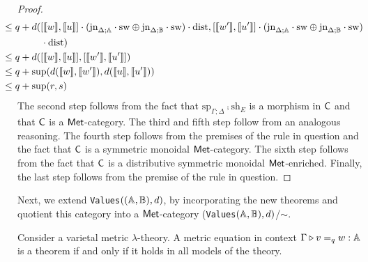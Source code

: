 \begin{proof}
\begin{align*}
    & \hspace{-20pt} \leq  q +  d( [\llbracket w\rrbracket ,\llbracket u\rrbracket] \comp (\text{jn}_{\Delta;\typeA}\comp \sw \oplus \text{jn}_{\Delta;\typeB}\comp \sw) \comp \dist,  [\llbracket w'\rrbracket ,\llbracket u'\rrbracket] \comp (\text{jn}_{\Delta;\typeA}\comp \sw \oplus \text{jn}_{\Delta;\typeB}\comp \sw)  \\
    & \hspace{20pt} \comp \dist)\\
    &  \hspace{-20pt} \leq q +  d( [\llbracket w\rrbracket ,\llbracket u\rrbracket],  [\llbracket w'\rrbracket ,\llbracket u'\rrbracket]) \\
    & \hspace{-20pt}  \leq q + \sup(d( \llbracket w\rrbracket , \llbracket w' \rrbracket), d( \llbracket u\rrbracket , \llbracket u' \rrbracket)) \\
    & \hspace{-20pt} \leq  q + \sup(r, s) \\
  \end{align*}
  The second step follows from the fact that $\text{sp}_{\Gamma;\Delta} \comp \text{sh}_{E}$  is a morphism in $\mathsf{C}$  and that $\mathsf{C}$ is a $\mathsf{Met}$-category.  The third and fifth step follow from an analogous reasoning. The fourth step follows from the premises of the rule in question and the fact that $\mathsf{C}$ is a symmetric monoidal $\mathsf{Met}$-category. The sixth step follows from the fact that $\mathsf{C}$ is a distributive symmetric monoidal $\mathsf{Met}$-enriched. Finally, the last step follows from the premise of the rule in question.

\end{proof}

Next, we extend  \texttt{Values}$((\mathbb{A},\mathbb{B}),d)$, by incorporating the new theorems and quotient this category into a  $\mathsf{Met}$-category (\texttt{Values}$(\mathbb{A},\mathbb{B}),d)$/$\sim$.


\begin{theorem}[Completeness]
Consider a varietal metric $\lambda$-theory. A metric equation in context
$\Gamma \triangleright v =_{q} w : \mathbb{A}$
is a theorem if and only if it holds in all models of the theory.
\end{theorem}

